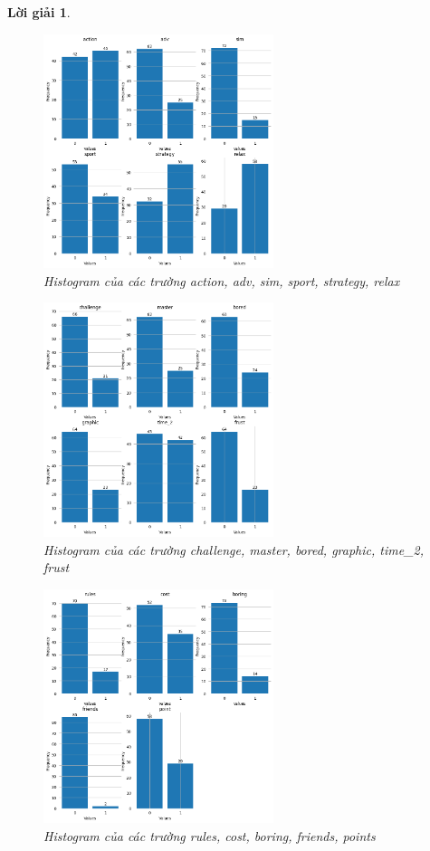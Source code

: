 \documentclass[14pt, a4paper]{article}
\theoremstyle{sltheorem}
\theoremstyle{soltheorem}
\newtheorem*{loigiai}{Lời giải}
\begin{document}
\begin{loigiai}
    \begin{figure}[h!]
        \centering
        \includegraphics[width=0.6\textwidth]{4.png}
        \caption{Histogram của các trường action, adv, sim, sport, strategy, relax}
        \label{fig:4}
    \end{figure}

    \begin{figure}[h!]
        \centering
        \includegraphics[width=0.6\textwidth]{5.png}
        \caption{Histogram của các trường challenge, master, bored, graphic, time\_2, frust}
        \label{fig:5}
    \end{figure}

    \begin{figure}[h!]
        \centering
        \includegraphics[width=0.6\textwidth]{6.png}
        \caption{Histogram của các trường rules, cost, boring, friends, points}
        \label{fig:6}
    \end{figure}


\end{loigiai}
\end{document}
